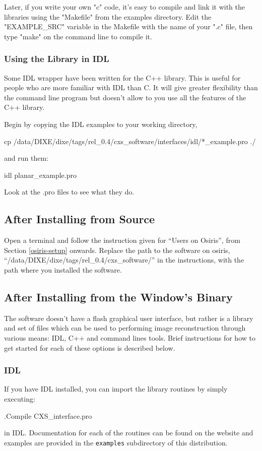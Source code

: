 \documentclass[]{cxs-software}
\begin{document}
Later, if you write your own "c" code, it's easy to compile and link
it with the libraries using the "Makefile" from the examples
directory. Edit the "EXAMPLE\_SRC" variable in the Makefile with the
name of your ".c" file, then type "make" on the command line to
compile it.

\subsubsection{Using the Library in IDL}

Some IDL wrapper have been written for the C++ library. This is useful
for people who are more familiar with IDL than C. It will give greater
flexibility than the command line program but doesn't allow to you use
all the features of the C++ library.

Begin by copying the IDL examples to your working directory, 
\begin{myverbatim}
cp /data/DIXE/dixe/tags/rel_0.4/cxs_software/interfaces/idl/*_example.pro ./ 
\end{myverbatim}
and run them: 
\begin{myverbatim}
idl planar_example.pro
\end{myverbatim}

Look at the .pro files to see what they do. 


\subsection{After Installing from Source}

Open a terminal and follow the instruction given for ``Users on
Osiris'', from Section \ref{osiris-setup} onwards. Replace the path to
the software on osiris,
``/data/DIXE/dixe/tags/rel\_0.4/cxs\_software/'' in the instructions,
with the path where you installed the software.

\subsection{After Installing from the Window's Binary}

The software doesn't have a flash graphical user interface, but rather
is a library and set of files which can be used to performing image
reconstruction through various means: IDL, C++ and command lines
tools. Brief instructions for how to get started for each of these
options is described below.

\subsubsection{IDL}
If you have IDL installed, you can import the library routines by
simply executing:
\begin{myverbatim}
 .Compile CXS_interface.pro
\end{myverbatim}
in IDL. Documentation for each of the routines can be found on the
website and examples are provided in the {\tt examples} subdirectory
of this distribution.
\end{document}
